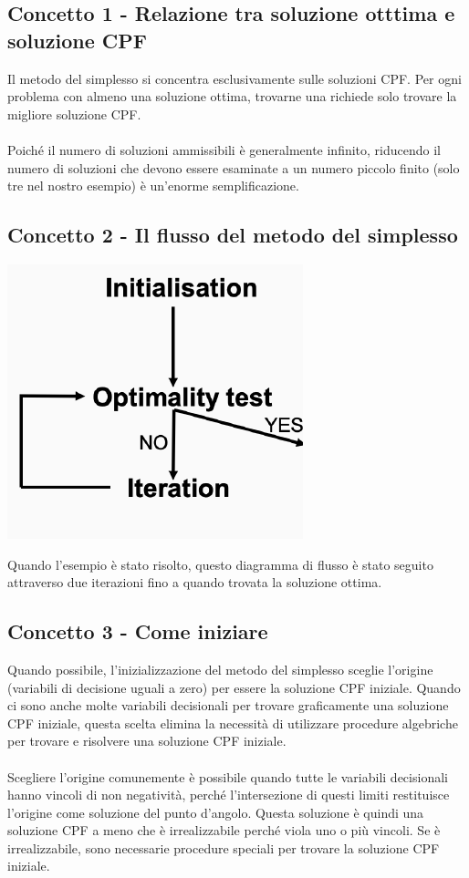 \documentclass[12pt,a4paper]{article}
\begin{document}
\subsection{Concetto 1 - Relazione tra soluzione otttima e soluzione CPF}
Il metodo del simplesso si concentra esclusivamente sulle soluzioni CPF. Per ogni problema con almeno una soluzione ottima, trovarne una richiede solo trovare la migliore soluzione CPF.\\\\
Poiché il numero di soluzioni ammissibili è generalmente infinito, riducendo il numero di soluzioni che devono essere esaminate a un numero piccolo finito (solo tre nel nostro esempio) è un'enorme semplificazione.

\subsection{Concetto 2 - Il flusso del metodo del simplesso}
\begin{center}
\includegraphics[width=0.6\columnwidth]{img/simplex_flow.png}
\end{center}
Quando l'esempio è stato risolto, questo diagramma di flusso è stato seguito attraverso due iterazioni fino a quando trovata la soluzione ottima.

\subsection{Concetto 3 - Come iniziare}
Quando possibile, l'inizializzazione del metodo del simplesso sceglie l'origine (variabili di decisione uguali a zero) per essere la soluzione CPF iniziale. Quando ci sono anche molte variabili decisionali per trovare graficamente una soluzione CPF iniziale, questa scelta elimina la necessità di utilizzare procedure algebriche per trovare e risolvere una soluzione CPF iniziale.\\
\\
Scegliere l'origine comunemente è possibile quando tutte le variabili decisionali hanno vincoli di non negatività, perché l'intersezione di questi limiti restituisce l'origine come soluzione del punto d'angolo. Questa soluzione è quindi una soluzione CPF a meno che è irrealizzabile perché viola uno o più vincoli. Se è irrealizzabile, sono necessarie procedure speciali per trovare la soluzione CPF iniziale.
\end{document}
